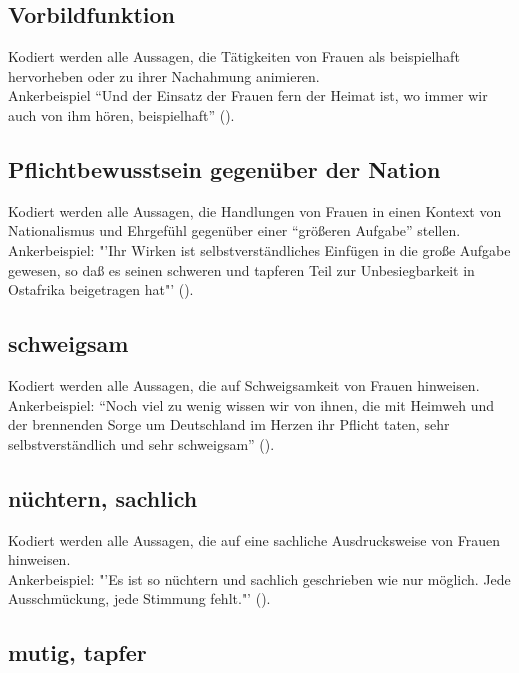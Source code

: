 \documentclass[12pt, titlepage=true, toc=bib]{scrartcl}
\begin{document}
\newpage

\subsection*{Vorbildfunktion}

Kodiert werden alle Aussagen, die Tätigkeiten von Frauen als beispielhaft hervorheben oder zu ihrer Nachahmung animieren.\\
Ankerbeispiel "`Und der Einsatz der Frauen fern der Heimat ist, wo immer wir auch von ihm hören, beispielhaft"' (\cite[669]{maltzahn_deutsche_1936}).

\subsection*{Pflichtbewusstsein gegenüber der Nation}

Kodiert werden alle Aussagen, die Handlungen von Frauen in einen Kontext von Nationalismus und Ehrgefühl gegenüber einer "`größeren Aufgabe"' stellen.\\
Ankerbeispiel: "'Ihr Wirken ist selbstverständliches Einfügen in die große Aufgabe gewesen, so daß es seinen schweren und tapferen Teil zur Unbesiegbarkeit in Ostafrika beigetragen hat"' (\cite[669]{maltzahn_deutsche_1936}).

\subsection*{schweigsam}

Kodiert werden alle Aussagen, die auf Schweigsamkeit von Frauen hinweisen.\\
Ankerbeispiel: "`Noch viel zu wenig wissen wir von ihnen, die mit Heimweh und der brennenden Sorge um Deutschland im Herzen ihr Pflicht taten, sehr selbstverständlich und sehr schweigsam"' (\cite[669]{maltzahn_deutsche_1936}).

\subsection*{nüchtern, sachlich}

Kodiert werden alle Aussagen, die auf eine sachliche Ausdrucksweise von Frauen hinweisen.\\
Ankerbeispiel: "'Es ist so nüchtern und sachlich geschrieben wie nur möglich. Jede Ausschmückung, jede Stimmung fehlt."' (\cite[669]{maltzahn_deutsche_1936}).

\subsection*{mutig, tapfer}
\end{document}

